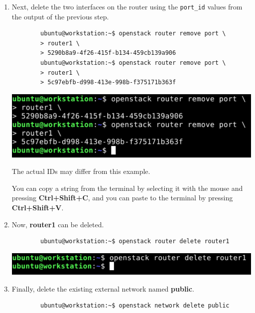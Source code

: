 \documentclass[letterpaper, 12pt]{article}
\begin{document}
\begin{enumerate}
    \item Next, delete the two interfaces on the router using the \texttt{port\_id} values from the output of the
    previous step.
    \begin{lstlisting}
        ubuntu@workstation:~$ openstack router remove port \
        > router1 \
        > 5290b8a9-4f26-415f-b134-459cb139a906
        ubuntu@workstation:~$ openstack router remove port \
        > router1 \
        > 5c97ebfb-d998-413e-998b-f375171b363f
    \end{lstlisting}

    \begin{center}
        \includegraphics[width=\linewidth]{images/part1/step16.png}
    \end{center}

    \begin{notebox}
        The actual IDs may differ from this example.
    \end{notebox}

    \begin{tipbox}
        You can copy a string from the terminal by selecting it with the mouse and pressing \textbf{Ctrl+Shift+C}, and
        you can paste to the terminal by pressing \textbf{Ctrl+Shift+V}.
    \end{tipbox}

    \item Now, \textbf{router1} can be deleted.
    \begin{lstlisting}
        ubuntu@workstation:~$ openstack router delete router1
    \end{lstlisting}

    \begin{center}
        \includegraphics[width=\linewidth]{images/part1/step17.png}
    \end{center}

    \item Finally, delete the existing external network named \textbf{public}.
    \begin{lstlisting}
        ubuntu@workstation:~$ openstack network delete public
    \end{lstlisting}


\end{enumerate}
\end{document}
